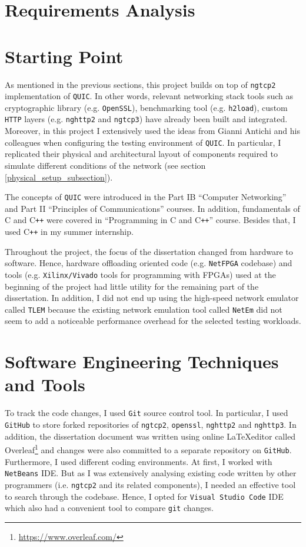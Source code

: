 \documentclass[12pt,a4paper,twoside,openright]{report}
\begin{document}
\section{Requirements Analysis}


\section{Starting Point}
As mentioned in the previous sections, this project builds on top of \texttt{ngtcp2} implementation of \texttt{QUIC}.
In other words, relevant networking stack tools such as cryptographic library (e.g. \texttt{OpenSSL}), benchmarking tool (e.g. \texttt{h2load}), custom \texttt{HTTP} layers (e.g. \texttt{nghttp2} and \texttt{ngtcp3}) have already been built and integrated. 
Moreover, in this project I extensively used the ideas from  Gianni Antichi and his colleagues \cite{Making_QUIC_Quicker} when configuring the testing environment of \texttt{QUIC}.
In particular, I replicated their physical and architectural layout of components required to simulate different conditions of the network (see section \ref{physical_setup_subsection}).

The concepts of \texttt{QUIC} were introduced in the Part IB \enquote{Computer Networking} and Part II \enquote{Principles of Communications} courses.
In addition, fundamentals of C and C\texttt{++} were covered in \enquote{Programming in C and C\texttt{++}} course. 
Besides that, I used C\texttt{++} in my summer internship.

Throughout the project, the focus of the dissertation changed from hardware to software.
Hence, hardware offloading oriented code (e.g. \texttt{NetFPGA} codebase) and tools (e.g. \texttt{Xilinx/Vivado} tools for programming with FPGAs) used at the beginning of the project had little utility for the remaining part of the dissertation.
In addition, I did not end up using the high-speed network emulator called \texttt{TLEM} \cite{TLEM_tool} because the existing network emulation tool called \texttt{NetEm} did not seem to add a noticeable performance overhead for the selected testing workloads.


\section{Software Engineering Techniques and Tools}
    To track the code changes, I used \texttt{Git} source control tool.
    In particular, I used \texttt{GitHub} to store forked repositories of \texttt{ngtcp2}, \texttt{openssl}, \texttt{nghttp2} and \texttt{nghttp3}.
    In addition, the dissertation document was written using online \LaTeX  editor called Overleaf\footnote{\url{https://www.overleaf.com/}} and changes were also committed to a separate repository on \texttt{GitHub}.
    Furthermore, I used different coding environments.
    At first, I worked with \texttt{NetBeans} IDE.
    But as I was extensively analysing existing code written by other programmers (i.e. \texttt{ngtcp2} and its related components), I needed an effective tool to search through the codebase.
    Hence, I opted for \texttt{Visual Studio Code} IDE which also had a convenient tool to compare \texttt{git} changes.
    
\end{document}
